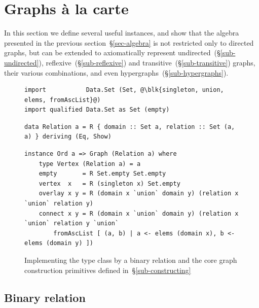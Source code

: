 \section{Graphs \`{a} la carte}\label{sec-a-la-carte}

In this section we define several useful  instances, and
show that the algebra presented in the previous section~\S\ref{sec-algebra} is
not restricted only
to directed graphs, but can be extended to axiomatically represent
undirected~(\S\ref{sub-undirected}), reflexive~(\S\ref{sub-reflexive})
and transitive~(\S\ref{sub-transitive}) graphs, their various combinations,
and even hypergraphs~(\S\ref{sub-hypergraphs}).

\begin{figure}
\begin{verbatim}
import           Data.Set (Set, @\blk{singleton, union, elems, fromAscList}@)
import qualified Data.Set as Set (empty)
\end{verbatim}
\vspace{1mm}
\begin{verbatim}
data Relation a = R { domain :: Set a, relation :: Set (a, a) } deriving (Eq, Show)
\end{verbatim}
\vspace{1mm}
\begin{verbatim}
instance Ord a => Graph (Relation a) where
    type Vertex (Relation a) = a
    empty       = R Set.empty Set.empty
    vertex  x   = R (singleton x) Set.empty
    overlay x y = R (domain x `union` domain y) (relation x `union` relation y)
    connect x y = R (domain x `union` domain y) (relation x `union` relation y `union`
        fromAscList [ (a, b) | a <- elems (domain x), b <- elems (domain y) ])
\end{verbatim}
\vspace{-2mm}
\caption{Implementing the  type class by a binary relation
and the core graph construction primitives
defined in~\S\ref{sub-constructing}\label{fig-relation}}
\vspace{-2mm}
\end{figure}

\subsection{Binary relation}\label{sub-relation}

